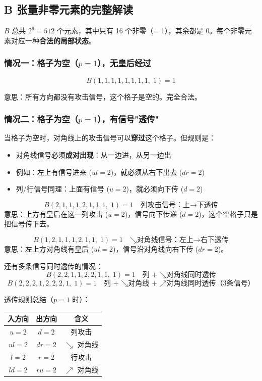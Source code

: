 \documentclass[12pt,a4paper]{article}
\begin{document}
\subsection{B 张量非零元素的完整解读}

$B$ 总共 $2^9 = 512$ 个元素，其中只有 16 个非零（= 1），其余都是 0。每个非零元素对应一种\textbf{合法的局部状态}。

\subsubsection{情况一：格子为空（$p=1$），无皇后经过}

$$B(1,1,1,1,1,1,1,1,\;1) = 1$$

意思：所有方向都没有攻击信号，这个格子是空的。完全合法。

\subsubsection{情况二：格子为空（$p=1$），有信号"透传"}

当格子为空时，对角线上的攻击信号可以\textbf{穿过}这个格子。但规则是：
\begin{itemize}
  \item 对角线信号必须\textbf{成对出现}：从一边进，从另一边出
  \item 例如：左上有信号进来 ($ul=2$)，就必须从右下出去 ($dr=2$)
  \item 列/行信号同理：上面有信号 ($u=2$)，就必须向下传 ($d=2$)
\end{itemize}

\begin{exbox}[透传的例子]
$$B(2,1,1,1,2,1,1,1,\;1) = 1 \quad \text{列攻击信号：上→下透传}$$
意思：上方有皇后在这一列攻击 ($u=2$)，信号向下传递 ($d=2$)，这个空格子只是把信号传下去。

$$B(1,2,1,1,1,2,1,1,\;1) = 1 \quad \text{↘对角线信号：左上→右下透传}$$
意思：左上方对角线有皇后 ($ul=2$)，信号沿对角线向右下传 ($dr=2$)。

还有多条信号同时透传的情况：
$$B(2,2,1,1,2,2,1,1,\;1) = 1 \quad \text{列 + ↘对角线同时透传}$$
$$B(2,2,2,1,2,2,2,1,\;1) = 1 \quad \text{列 + ↘对角线 + ↗对角线同时透传（3条信号）}$$
\end{exbox}

透传规则总结（$p=1$ 时）：
\begin{center}
\begin{tabular}{ccc}
\toprule
\textbf{入方向} & \textbf{出方向} & \textbf{含义} \\
\midrule
$u=2$ & $d=2$ & 列攻击 \\
$ul=2$ & $dr=2$ & $\searrow$ 对角线 \\
$l=2$ & $r=2$ & 行攻击 \\
$ld=2$ & $ru=2$ & $\nearrow$ 对角线 \\
\bottomrule
\end{tabular}
\end{center}
\end{document}
